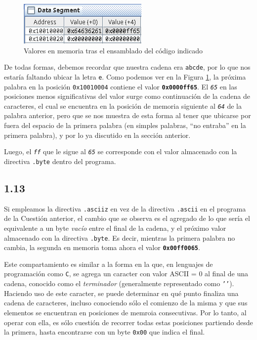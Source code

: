 \documentclass[a4paper]{report}
\begin{document}
\begin{figure}[h]
    \centering
    \captionsetup{justification = centering}
    \includegraphics[width=.4\linewidth]{img/c1-12}
    \caption{Valores en memoria tras el ensamblado del código indicado}
    \label{fig:ascii-mem}
\end{figure}

De todas formas, debemos recordar que nuestra cadena era \texttt{abcde}, por lo que nos estaría faltando ubicar la letra \texttt{\textquotesingle{}e\textquotesingle{}}. Como podemos ver en la Figura \ref{fig:ascii-mem}, la próxima palabra en la posición \texttt{0x10010004} contiene el valor \textbf{\texttt{0x0000ff65}}. El \textsl{\texttt{65}} en las posiciones menos significativas del valor surge como continuación de la cadena de caracteres, el cual se encuentra en la posición de memoria siguiente al \textsl{\texttt{64}} de la palabra anterior, pero que se nos muestra de esta forma al tener que ubicarse por fuera del espacio de la primera palabra (en simples palabras, ``no entraba'' en la primera palabra), y por lo ya discutido en la sección anterior.

Luego, el \textsl{\texttt{ff}} que le sigue al \textsl{\texttt{65}} se corresponde con el valor almacenado con la directiva \texttt{.byte} dentro del programa.

\subsection*{1.13}

Si empleamos la directiva \texttt{.asciiz} en vez de la directiva \texttt{.ascii} en el programa de la Cuestión anterior, el cambio que se observa es el agregado de lo que sería el equivalente a un byte \textit{vacío} entre el final de la cadena, y el próximo valor almacenado con la directiva \texttt{.byte}. Es decir, mientras la primera palabra no cambia, la segunda en memoria toma ahora el valor \textbf{\texttt{0x00ff0065}}.

Este compartamiento es similar a la forma en la que, en lenguajes de programación como \texttt{C}, se agrega un caracter con valor ASCII = 0 al final de una cadena, conocido como el \textit{terminador} (generalmente representado como {\texttt{'\0'}}). Haciendo uso de este caracter, se puede determinar en qué punto finaliza una cadena de caracteres, incluso conociendo sólo el comienzo de la misma y que sus elementos se encuentran en posiciones de memroia consecutivas. Por lo tanto, al operar con ella, es sólo cuestión de recorrer todas estas posiciones partiendo desde la primera, hasta encontrarse con un byte \texttt{0x00} que indica el final.
\end{document}
